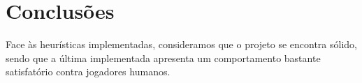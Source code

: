 
\section{Conclusões}

Face às heurísticas implementadas, consideramos que o projeto se encontra sólido, sendo que a última implementada apresenta um comportamento bastante satisfatório contra jogadores humanos. 